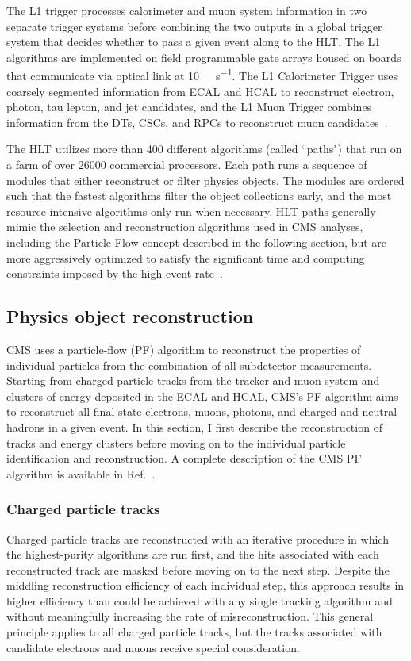 The L1 trigger processes calorimeter and muon system information in two separate trigger systems before combining the two outputs in a global trigger system that decides whether to pass a given event along to the HLT. The L1 algorithms are implemented on field programmable gate arrays housed on boards that communicate via optical link at \SI{10}{\giga\byte\per\s}. The L1 Calorimeter Trigger uses coarsely segmented information from ECAL and HCAL to reconstruct electron, photon, tau lepton, and jet candidates, and the L1 Muon Trigger combines information from the DTs, CSCs, and RPCs to reconstruct muon candidates~\cite{cms_l1_upgrade}.

The HLT utilizes more than 400 different algorithms (called ``paths") that run on a farm of over \num{26000} commercial processors. Each path runs a sequence of modules that either reconstruct or filter physics objects. The modules are ordered such that the fastest algorithms filter the object collections early, and the most resource-intensive algorithms only run when necessary. HLT paths generally mimic the selection and reconstruction algorithms used in CMS analyses, including the Particle Flow concept described in the following section, but are more aggressively optimized to satisfy the significant time and computing constraints imposed by the high event rate~\cite{trigger_run2}.

\subsection{Physics object reconstruction}
\label{cms_reco}
CMS uses a particle-flow (PF) algorithm to reconstruct the properties of individual particles from the combination of all subdetector measurements. Starting from charged particle tracks from the tracker and muon system and clusters of energy deposited in the ECAL and HCAL, CMS's PF algorithm aims to reconstruct all final-state electrons, muons, photons, and charged and neutral hadrons in a given event. In this section, I first describe the reconstruction of tracks and energy clusters before moving on to the individual particle identification and reconstruction. A complete description of the CMS PF algorithm is available in Ref.~\cite{cms_pf}.

\subsubsection{Charged particle tracks}
Charged particle tracks are reconstructed with an iterative procedure in which the highest-purity algorithms are run first, and the hits associated with each reconstructed track are masked before moving on to the next step. Despite the middling reconstruction efficiency of each individual step, this approach results in higher efficiency than could be achieved with any single tracking algorithm and without meaningfully increasing the rate of misreconstruction. This general principle applies to all charged particle tracks, but the tracks associated with candidate electrons and muons receive special consideration.

